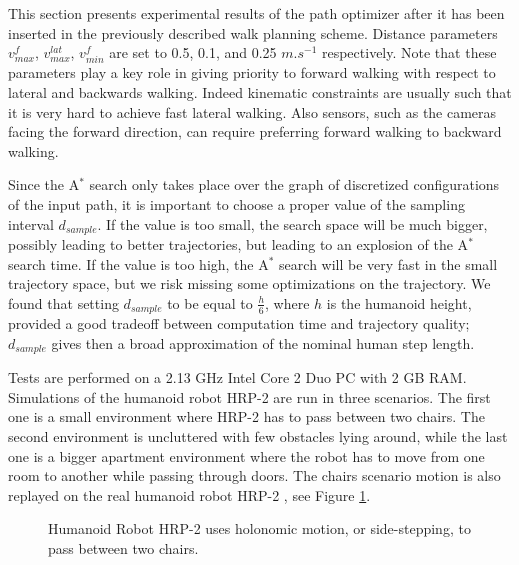 This section presents experimental results of the path optimizer after
it has been inserted in the previously described walk planning
scheme. Distance parameters $v_{max}^f$, $v_{max}^{lat}$, $v_{min}^f$
are set to 0.5, 0.1, and 0.25 $m.s^{-1}$ respectively. Note that these
parameters play a key role in giving priority to forward walking with
respect to lateral and backwards walking. Indeed kinematic constraints
are usually such that it is very hard to achieve fast lateral
walking. Also sensors, such as the cameras facing the forward
direction, can require preferring forward walking to backward walking.

Since the A$^{*}$ search only takes place over the graph of
discretized configurations of the input path, it is important to
choose a proper value of the sampling interval $d_{sample}$. If the
value is too small, the search space will be much bigger, possibly
leading to better trajectories, but leading to an explosion of the
A$^{*}$ search time. If the value is too high, the A$^{*}$ search will
be very fast in the small trajectory space, but we risk missing some
optimizations on the trajectory. We found that setting $d_{sample}$ to
be equal to $\frac{h}{6}$, where $h$ is the humanoid height, provided
a good tradeoff between computation time and trajectory quality;
$d_{sample}$ gives then a broad approximation of the nominal human
step length.

Tests are performed on a 2.13 GHz Intel Core 2 Duo PC with 2 GB RAM.
Simulations of the humanoid robot HRP-2 are run in three scenarios.
The first one is a small environment where HRP-2 has to pass between
two chairs. The second environment is uncluttered with few obstacles
lying around, while the last one is a bigger apartment environment
where the robot has to move from one room to another while passing
through doors. The chairs scenario motion is also replayed on the real
humanoid robot HRP-2 \cite{kane04}, see Figure
\ref{fig:chap1-hrp2-chairs}.

\begin{figure}
  \caption[HRP-2 uses holonomic motion to pass between two
    chairs.]{Humanoid Robot HRP-2 uses holonomic motion, or
    side-stepping, to pass between two chairs.}
  \label{fig:chap1-hrp2-chairs}
\end{figure}

